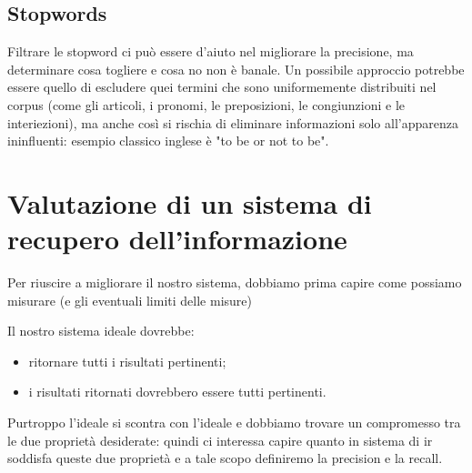 \subsection{Stopwords}
Filtrare le stopword ci può essere d’aiuto nel migliorare la precisione, ma determinare cosa togliere e cosa no non è banale. Un possibile approccio potrebbe essere quello di escludere quei termini che sono uniformemente distribuiti nel corpus (come gli articoli, i pronomi, le preposizioni, le congiunzioni e le interiezioni), ma anche così si rischia di eliminare informazioni solo all'apparenza ininfluenti: esempio classico inglese è "to be or not to be".

\section{Valutazione di un sistema di recupero dell'informazione}
Per riuscire a migliorare il nostro sistema, dobbiamo prima capire come possiamo misurare (e gli eventuali limiti delle misure)

Il nostro sistema ideale dovrebbe:
\begin{itemize}
    \item ritornare tutti i risultati pertinenti;
    \item i risultati ritornati dovrebbero essere tutti pertinenti.
\end{itemize}

Purtroppo l’ideale si scontra con l’ideale e dobbiamo trovare un compromesso tra le due proprietà desiderate: quindi ci interessa capire quanto in sistema di \gls{ir} soddisfa queste due proprietà e a tale scopo definiremo la precision e la recall.


